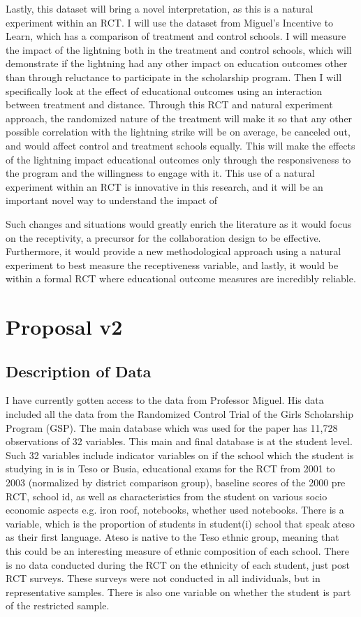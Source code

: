\documentclass{article}
\begin{document}
Lastly, this dataset will bring a novel interpretation, as this is a natural experiment within an RCT. I will use the dataset from Miguel's Incentive to Learn, which has a comparison of treatment and control schools. I will measure the impact of the lightning both in the treatment and control schools, which will demonstrate if the lightning had any other impact on education outcomes other than through reluctance to participate in the scholarship program. Then I will specifically look at the effect of educational outcomes using an interaction between treatment and distance. Through this RCT and natural experiment approach, the randomized nature of the treatment will make it so that any other possible correlation with the lightning strike will be on average, be canceled out, and would affect control and treatment schools equally. This will make the effects of the lightning impact educational outcomes only through the responsiveness to the program and the willingness to engage with it. This use of a natural experiment within an RCT is innovative in this research, and it will be an important novel way to understand the impact of 

Such changes and situations would greatly enrich the literature as it would focus on the receptivity, a precursor for the collaboration design to be effective. Furthermore, it would provide a new methodological approach using a natural experiment to best measure the receptiveness variable, and lastly, it would be within a formal RCT where educational outcome measures are incredibly reliable. 

\section{Proposal v2}

\subsection{Description of Data}

I have currently gotten access to the data from Professor Miguel. His data included all the data from the Randomized Control Trial of the Girls Scholarship Program (GSP). The main database which was used for the paper has 11,728 observations of 32 variables. This main and final database is at the student level. Such 32 variables include indicator variables on if the school which the student is studying in is in Teso or Busia, educational exams for the RCT from 2001 to 2003 (normalized by district comparison group), baseline scores of the 2000 pre RCT, school id, as well as characteristics from the student on various socio economic aspects e.g. iron roof, notebooks, whether used notebooks. There is a variable, which is the proportion of students in student(i) school that speak ateso as their first language. Ateso is native to the Teso ethnic group, meaning that this could be an interesting measure of ethnic composition of each school. There is no data conducted during the RCT on the ethnicity of each student, just post RCT surveys. These surveys were not conducted in all individuals, but in representative samples. There is also one variable on whether the student is part of the restricted sample. 
\end{document}
